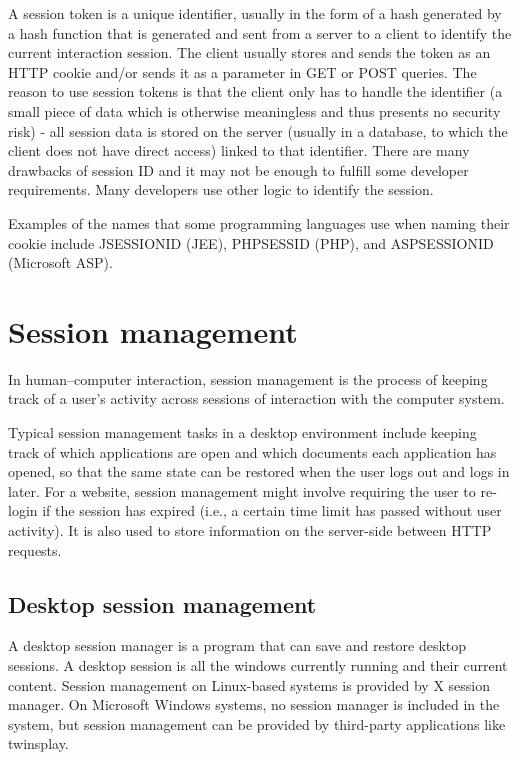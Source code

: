 A session token is a unique identifier, usually in the form of a hash generated by a hash function that is generated and sent from a server to a client to identify the current interaction session. The client usually stores and sends the token as an HTTP cookie and/or sends it as a parameter in GET or POST queries. The reason to use session tokens is that the client only has to handle the identifier (a small piece of data which is otherwise meaningless and thus presents no security risk) - all session data is stored on the server (usually in a database, to which the client does not have direct access) linked to that identifier. There are many drawbacks of session ID and it may not be enough to fulfill some developer requirements. Many developers use other logic to identify the session.


Examples of the names that some programming languages use when naming their cookie include JSESSIONID (JEE), PHPSESSID (PHP), and ASPSESSIONID (Microsoft ASP).



\chapter{Session management}


In human–computer interaction, session management is the process of keeping track of a user's activity across sessions of interaction with the computer system.

Typical session management tasks in a desktop environment include keeping track of which applications are open and which documents each application has opened, so that the same state can be restored when the user logs out and logs in later. For a website, session management might involve requiring the user to re-login if the session has expired (i.e., a certain time limit has passed without user activity). It is also used to store information on the server-side between HTTP requests.




\section{Desktop session management}


A desktop session manager is a program that can save and restore desktop sessions. A desktop session is all the windows currently running and their current content. Session management on Linux-based systems is provided by X session manager. On Microsoft Windows systems, no session manager is included in the system, but session management can be provided by third-party applications like twinsplay.






